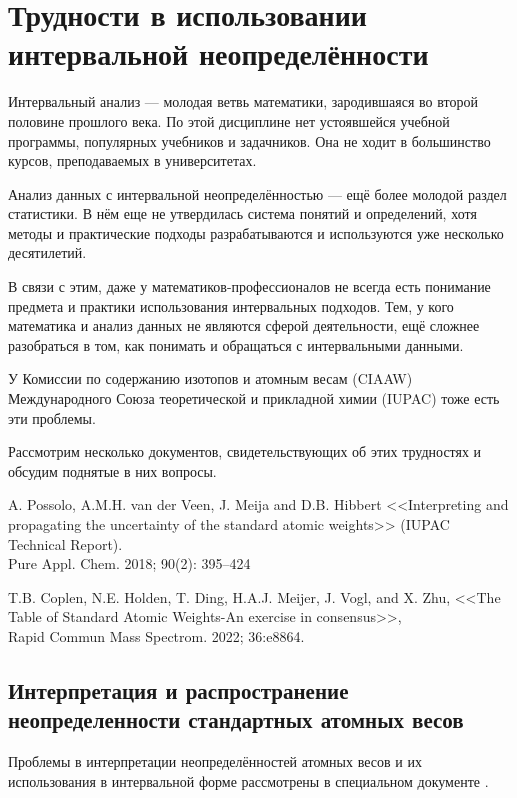 \documentclass[a5paper,openany]{book}
\begin{document}
\chapter{Трудности в использовании интервальной неопределённости}

Интервальный анализ --- молодая ветвь математики, зародившаяся во второй половине прошлого века. По этой дисциплине нет устоявшейся учебной программы, популярных учебников и задачников. Она не ходит в большинство курсов, преподаваемых в университетах.

Анализ данных с интервальной неопределённостью --- ещё более молодой раздел статистики. В нём еще не утвердилась система понятий и определений, хотя методы и практические подходы разрабатываются и используются уже несколько десятилетий.

В связи с этим, даже у математиков-профессионалов не всегда есть понимание предмета и практики использования интервальных подходов. Тем, у кого математика и анализ данных не являются сферой деятельности, ещё сложнее разобраться в том, как понимать и обращаться с интервальными данными.  

У Комиссии по содержанию изотопов и атомным весам (CIAAW) Международного Союза теоретической и прикладной химии (IUPAC) тоже есть эти проблемы.

Рассмотрим несколько документов, свидетельствующих об этих трудностях и обсудим поднятые в них вопросы. 

A. Possolo, A.M.H. van der Veen, J. Meija and D.B. Hibbert
<<Interpreting and propagating the uncertainty of the standard atomic weights>> (IUPAC Technical Report). \\
Pure Appl. Chem. 2018; 90(2): 395–424 \cite{IUPACUncertainty}

T.B. Coplen, N.E. Holden, T. Ding, H.A.J. Meijer, J. Vogl, and X. Zhu, <<The Table of Standard Atomic Weights-An exercise in consensus>>, \\ Rapid Commun Mass Spectrom. 2022; 36:e8864. \cite{IUPACCosensus}


\section{Интерпретация и распространение неопределенности стандартных атомных весов}

Проблемы в интерпретации неопределённостей атомных весов и их использования в интервальной форме рассмотрены в специальном документе \cite{IUPACUncertainty}. 
\end{document}
